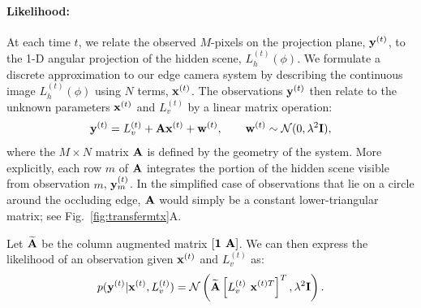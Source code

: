 \paragraph{Likelihood: } At each time $t$, we relate the observed $M$-pixels on the projection plane, $\mathbf{y}^{(t)}$, to the 1-D angular projection of the hidden scene, $L_h^{(t)} (\phi)$.
We formulate a discrete approximation to our edge camera system by describing the continuous image $L_h^{(t)} (\phi)$ using $N$ terms, $\mathbf{x}^{(t)}$.
The observations $\mathbf{y}^{(t)}$ then relate to the unknown parameters $\mathbf{x}^{(t)}$ and $L_v^{(t)}$ by a linear matrix operation:
\begin{align}
 \notag   \mathbf{y}^{(t)} = L_v^{(t)} + \mathbf{A}\mathbf{x}^{(t)} + \mathbf{w}^{(t)},\qquad
    \mathbf{w}^{(t)} \sim \mathcal{N}(0, \lambda^2\mathbf{I}),
\end{align}
where the $M \times N$ matrix $\mathbf{A}$ is defined by the geometry of the system. More
explicitly, each row $m$ of $\mathbf{A}$ integrates the portion of the hidden scene
visible from observation $m$, $\mathbf{y}^{(t)}_m$. In the simplified case of observations that lie on a circle around the occluding edge,
$\mathbf{A}$ would simply be a constant lower-triangular matrix;
see Fig.~\ref{fig:transfermtx}A. 



Let $\widetilde{\mathbf{A}}$ be the column augmented matrix $ \left[ \mathbf{1} \hspace{0.05in} \mathbf{A} \right]$. We can then express the likelihood of an observation given $\mathbf{x}^{(t)}$ and $L_v^{(t)}$ as:
\begin{equation}
    p(\mathbf{y}^{(t)}|\mathbf{x}^{(t)}, L_v^{(t)} ) = \mathcal{N} \left(\widetilde{\mathbf{A}} \left[ L_v^{(t)} \hspace{0.05in} {\mathbf{x}}^{(t)T} \right]^T, \lambda^2\mathbf{I} \right).
\end{equation}

